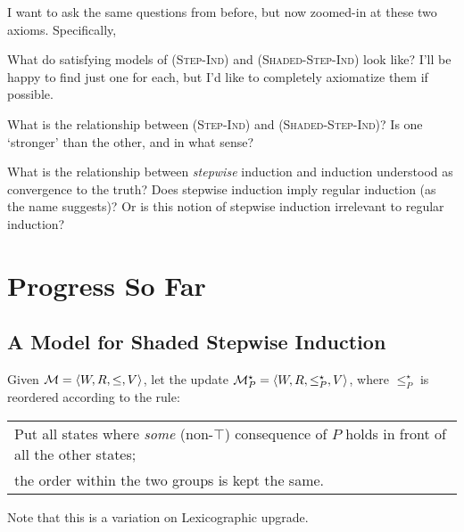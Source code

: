 \documentclass[letterpaper]{article}
\begin{document}
I want to ask the same questions from before, but now zoomed-in at these two axioms.  Specifically,

\begin{question}
    What do satisfying models of \textsc{(Step-Ind)} and \textsc{(Shaded-Step-Ind)} look like?  I'll be happy to find just one for each, but I'd like to completely axiomatize them if possible.
\end{question}

\begin{question}
    What is the relationship between \textsc{(Step-Ind)} and \textsc{(Shaded-Step-Ind)}?  Is one `stronger' than the other, and in what sense?
\end{question}

\begin{question}
    What is the relationship between \emph{stepwise} induction and induction understood as convergence to the truth?  Does stepwise induction imply regular induction (as the name suggests)?  Or is this notion of stepwise induction irrelevant to regular induction?
\end{question}


\section*{Progress So Far}

\subsection*{A Model for Shaded Stepwise Induction}

\begin{definition}
    Given $\mathcal{M} = \langle W, R, \leq, V \rangle$, let the update $\mathcal{M}^\star_P = \langle W, R, \leq^\star_P, V \rangle$, where $\leq^\star_P$ is reordered according to the rule:
    \begin{center}
    \begin{tabular}{l}
        Put all states where \emph{some} (non-$\top$) consequence of
        $P$ holds in front of all the other states;\\
        the order within the two groups is kept the same.
    \end{tabular}
    \end{center}
    Note that this is a variation on Lexicographic upgrade.

\end{definition}
\end{document}
